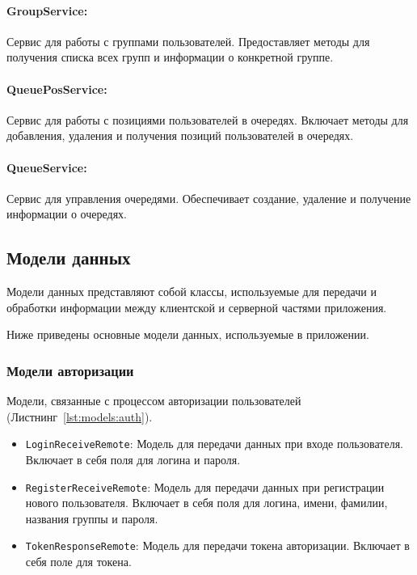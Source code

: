 \paragraph{GroupService:}
Сервис для работы с группами пользователей.
Предоставляет методы для получения списка всех групп
и информации о конкретной группе.

\paragraph{QueuePosService:}
Сервис для работы с позициями пользователей в очередях.
Включает методы для добавления, удаления
и получения позиций пользователей в очередях.

\paragraph{QueueService:}
Сервис для управления очередями. Обеспечивает создание, удаление
и получение информации о очередях.


\subsection{Модели данных}

Модели данных представляют собой классы, используемые для передачи
и обработки информации между клиентской и серверной частями приложения.\par
Ниже приведены основные модели данных, используемые в приложении.

\subsubsection{Модели авторизации}
Модели, связанные с процессом авторизации пользователей
(Листнинг~\ref{lst:models:auth}).

\begin{itemize}
    \item \texttt{LoginReceiveRemote}: Модель для передачи данных
		при входе пользователя. Включает в себя поля для логина и пароля.
    \item \texttt{RegisterReceiveRemote}: Модель для передачи данных
		при регистрации нового пользователя.
		Включает в себя поля для логина, имени, фамилии,
		названия группы и пароля.
    \item \texttt{TokenResponseRemote}: Модель для передачи
		токена авторизации. Включает в себя поле для токена.
\end{itemize}

